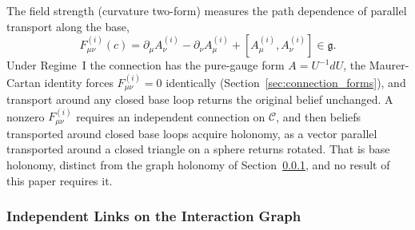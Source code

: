 The field strength (curvature two-form) measures the path dependence of parallel transport along the base,
\begin{equation}
F^{(i)}_{\mu\nu}(c) = \partial_\mu A^{(i)}_\nu - \partial_\nu A^{(i)}_\mu + [A^{(i)}_\mu, A^{(i)}_\nu] \in \mathfrak{g}.
\label{eq:field_strength}
\end{equation}
Under Regime~I the connection has the pure-gauge form $A = U^{-1}dU$, the Maurer-Cartan identity forces $F^{(i)}_{\mu\nu} = 0$ identically (Section~\ref{sec:connection_forms}), and transport around any closed base loop returns the original belief unchanged. A nonzero $F^{(i)}_{\mu\nu}$ requires an independent connection on $\mathcal{C}$, and then beliefs transported around closed base loops acquire holonomy, as a vector parallel transported around a closed triangle on a sphere returns rotated. That is base holonomy, distinct from the graph holonomy of Section~\ref{sec:discrete_regime_ii}, and no result of this paper requires it.

\subsubsection{Independent Links on the Interaction Graph}
\label{sec:discrete_regime_ii}

